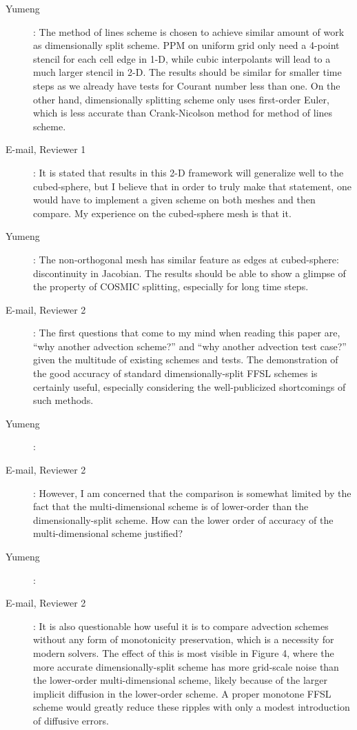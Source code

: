 \documentclass[12pt,a4paper]{article}
\begin{document}
\begin{description}
\item [Yumeng]: The method of lines scheme is chosen to achieve similar amount of work as dimensionally split scheme. PPM on uniform grid only need a 4-point stencil for each cell edge in 1-D, while cubic interpolants will lead to a much larger stencil in 2-D. The results should be similar for smaller time steps as we already have tests for Courant number less than one. On the other hand, dimensionally splitting scheme only uses first-order Euler, which is less accurate than Crank-Nicolson method for method of lines scheme.

\item [E-mail, Reviewer 1]: It is stated that results in this 2-D framework will generalize well to the cubed-sphere, but I believe that in order to truly make that statement, one would have to implement a given scheme on both meshes and then compare. My experience on the cubed-sphere mesh is that it.

\item [Yumeng]: The non-orthogonal mesh has similar feature as edges at cubed-sphere: discontinuity in Jacobian. The results should be able to show a glimpse of the property of COSMIC splitting, especially for long time steps. 

\item [E-mail, Reviewer 2]: The first questions that come to my mind when reading this paper are, ``why another advection scheme?'' and ``why another advection test case?'' given the multitude of existing schemes and tests. The demonstration of the good accuracy of standard dimensionally-split FFSL schemes is certainly useful, especially considering the well-publicized shortcomings of such methods. 

\item [Yumeng]: 

\item [E-mail, Reviewer 2]:  However, I am concerned that the comparison is somewhat limited by the fact that the multi-dimensional scheme is of lower-order than the dimensionally-split scheme. How can the lower order of accuracy of the multi-dimensional scheme justified?

\item [Yumeng]:

\item [E-mail, Reviewer 2]: It is also questionable how useful it is to compare advection schemes without any form of monotonicity preservation, which is a necessity for modern solvers. The effect of this is most visible in Figure 4, where the more accurate dimensionally-split scheme has more grid-scale noise than the lower-order multi-dimensional scheme, likely because of the larger implicit diffusion in the lower-order scheme. A proper monotone FFSL scheme would greatly reduce these ripples with only a modest introduction of diffusive errors.


\end{description}
\end{document}

